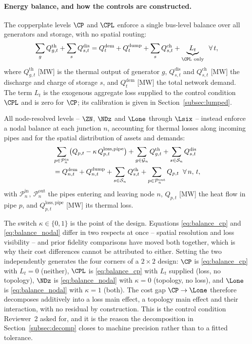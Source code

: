\paragraph{Energy balance, and how the controls are constructed.}
The copperplate levels $\CP$ and $\CPL$ enforce a single bus-level balance over all
generators and storage, with no spatial routing:
%
\begin{equation}
  \sum_{g} Q_{g,t}^{\mathrm{th}}
    + \sum_{s} Q_{s,t}^{\mathrm{dis}}
  = Q_t^{\mathrm{dem}} + Q_t^{\mathrm{dump}}
    + \sum_{s} Q_{s,t}^{\mathrm{ch}}
  + \underbrace{L_t}_{\CPL\ \mathrm{only}}
  \;\; \forall\, t,
  \label{eq:balance_cp}
\end{equation}
%
where $Q_{g,t}^{\mathrm{th}}$ [MW] is the thermal output of generator $g$,
$Q_{s,t}^{\mathrm{dis}}$ and $Q_{s,t}^{\mathrm{ch}}$ [MW] the discharge and charge of
storage $s$, and $Q_t^{\mathrm{dem}}$ [MW] the total network demand. The term $L_t$ is
the exogenous aggregate loss supplied to the control condition $\CPL$ and is zero for
$\CP$; its calibration is given in Section~\ref{subsec:lumped}.

All node-resolved levels -- $\ZN$, $\NDz$ and $\Lone$ through $\Lsix$ -- instead enforce
a nodal balance at each junction $n$, accounting for thermal losses along incoming pipes
and for the spatial distribution of assets and demands:
%
\begin{align}
  &\sum_{p \in \mathcal{P}_n^{\mathrm{in}}}
    \bigl(Q_{p,t} - \kappa\, Q_{p,t}^{\mathrm{loss,pipe}}\bigr)
  + \sum_{g \in \mathcal{G}_n} Q_{g,t}^{\mathrm{th}}
  + \sum_{s \in \mathcal{S}_n} Q_{s,t}^{\mathrm{dis}} \notag \\
  &= Q_{n,t}^{\mathrm{dem}} + Q_{n,t}^{\mathrm{dump}}
  + \sum_{s \in \mathcal{S}_n} Q_{s,t}^{\mathrm{ch}}
  + \sum_{p \in \mathcal{P}_n^{\mathrm{out}}} Q_{p,t}
  \;\; \forall\, n,\, t,
  \label{eq:balance_nodal}
\end{align}
%
with $\mathcal{P}_n^{\mathrm{in}}$, $\mathcal{P}_n^{\mathrm{out}}$ the pipes entering and
leaving node $n$, $Q_{p,t}$ [MW] the heat flow in pipe $p$, and
$Q_{p,t}^{\mathrm{loss,pipe}}$ [MW] its thermal loss.

The switch $\kappa \in \{0,1\}$ is the point of the design. Equations
\eqref{eq:balance_cp} and \eqref{eq:balance_nodal} differ in two respects at once --
spatial resolution and loss visibility -- and prior fidelity comparisons have moved both
together, which is why their cost differences cannot be attributed to either. Setting the
two independently generates the four corners of a $2\times2$ design: $\CP$ is
\eqref{eq:balance_cp} with $L_t = 0$ (neither), $\CPL$ is \eqref{eq:balance_cp} with
$L_t$ supplied (loss, no topology), $\NDz$ is \eqref{eq:balance_nodal} with $\kappa = 0$
(topology, no loss), and $\Lone$ is \eqref{eq:balance_nodal} with $\kappa = 1$ (both).
The cost gap $\CP \to \Lone$ therefore decomposes additively into a loss main effect, a
topology main effect and their interaction, with no residual by construction. This is the
control condition Reviewer~2 asked for, and it is the reason the decomposition in
Section~\ref{subsec:decomp} closes to machine precision rather than to a fitted
tolerance.

